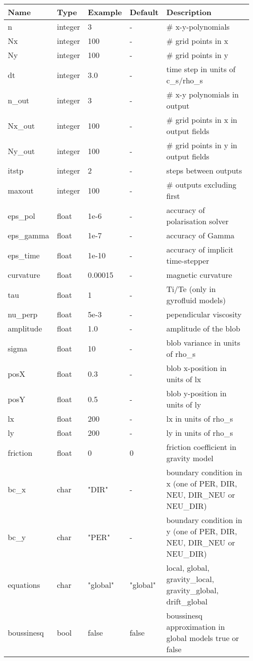 \documentclass{hitec}
\begin{document}
\begin{longtable}{llllp{7cm}}
\toprule
\rowcolor{gray!50}\bf Name &  \bf Type & \bf Example & \bf Default & \bf Description  \\ \midrule
n      & integer & 3 & - &\# x-y-polynomials \\
Nx     & integer &100& - &\# grid points in x \\
Ny     & integer &100& - &\# grid points in y \\
dt     & integer &3.0& - &time step in units of c\_s/rho\_s \\
n\_out  & integer &3  & - &\# x-y polynomials in output \\
Nx\_out & integer &100& - &\# grid points in x in output fields \\
Ny\_out & integer &100& - &\# grid points in y in output fields \\
itstp  & integer &2  & - &   steps between outputs \\
maxout & integer &100& - &      \# outputs excluding first \\
eps\_pol   & float &1e-6    & - &  accuracy of polarisation solver \\
eps\_gamma & float &1e-7    & - & accuracy of Gamma  \\
eps\_time  & float &1e-10   & - & accuracy of implicit time-stepper \\
curvature  & float &0.00015& - & magnetic curvature \\
tau        & float &1      & - & Ti/Te (only in gyrofluid models) \\
nu\_perp    & float &5e-3   & - & pependicular viscosity \\
amplitude  & float &1.0    & - & amplitude of the blob \\
sigma      & float &10     & - & blob variance in units of rho\_s \\
posX       & float &0.3    & - & blob x-position in units of lx \\
posY       & float &0.5    & - & blob y-position in units of ly \\
lx         & float &200    & - & lx in units of rho\_s \\
ly         & float &200    & - & ly in units of rho\_s \\
friction   & float & 0     & 0 & friction coefficient in gravity model \\
bc\_x   & char & "DIR"      & - & boundary condition in x (one of PER, DIR, NEU, DIR\_NEU or NEU\_DIR) \\
bc\_y   & char & "PER"      & - & boundary condition in y (one of PER, DIR, NEU, DIR\_NEU or NEU\_DIR) \\
equations  & char & "global" & "global" &local, global, gravity\_local, gravity\_global, drift\_global \\
boussinesq & bool & false    & false &boussinesq approximation in global models true or false\\
\bottomrule
\end{longtable}
\end{document}
